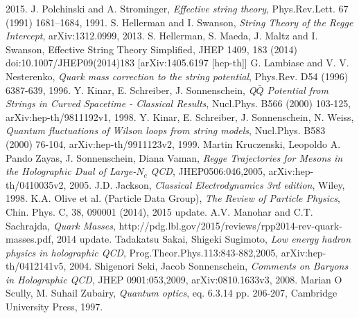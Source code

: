 \documentclass[11pt,a4paper]{article}
\begin{document}
\begin{thebibliography}{9}
	2015.
	J. Polchinski and A. Strominger,
	\emph{Effective string theory},
	Phys.Rev.Lett. 67 (1991) 1681–1684,
	1991.
	S. Hellerman and I. Swanson,
	\emph{String Theory of the Regge Intercept},
	arXiv:1312.0999,
	2013.
	S. Hellerman, S. Maeda, J. Maltz and I. Swanson, 
	Effective String Theory Simplified,
	JHEP 1409, 183 (2014) doi:10.1007/JHEP09(2014)183 [arXiv:1405.6197 [hep-th]]
	G. Lambiase and V. V. Nesterenko,
	\emph{Quark mass correction to the string potential},
	Phys.Rev. D54 (1996) 6387-639,
	1996.
	Y. Kinar, E. Schreiber, J. Sonnenschein,
	\emph{Q$\bar{Q}$ Potential from Strings in Curved Spacetime - Classical Results},
	Nucl.Phys. B566 (2000) 103-125,
	arXiv:hep-th/9811192v1,
	1998.
	Y. Kinar, E. Schreiber, J. Sonnenschein, N. Weiss,
	\emph{Quantum fluctuations of Wilson loops from string models},
	Nucl.Phys. B583 (2000) 76-104,
	arXiv:hep-th/9911123v2,
	1999.
	Martin Kruczenski, Leopoldo A. Pando Zayas, J. Sonnenschein, Diana Vaman,
	\emph{Regge Trajectories for Mesons in the Holographic Dual of Large-$N_c$ QCD},
	JHEP0506:046,2005,
	arXiv:hep-th/0410035v2,
	2005.
	J.D. Jackson,
	\emph{Classical Electrodynamics 3rd edition},
	Wiley,
	1998.	
	K.A. Olive et al. (Particle Data Group),
	\emph{The Review of Particle Physics},
	Chin. Phys. C, 38, 090001 (2014),
	2015 update.
	A.V. Manohar and C.T. Sachrajda,
	\emph{Quark Masses},
	http://pdg.lbl.gov/2015/reviews/rpp2014-rev-quark-masses.pdf,
	2014 update.	
	Tadakatsu Sakai, Shigeki Sugimoto,
	\emph{Low energy hadron physics in holographic QCD},
	Prog.Theor.Phys.113:843-882,2005,
	arXiv:hep-th/0412141v5,
	2004.
	Shigenori Seki, Jacob Sonnenschein,
	\emph{Comments on Baryons in Holographic QCD},
	JHEP 0901:053,2009,
	arXiv:0810.1633v3,
	2008.
	Marian O Scully, M. Suhail Zubairy,
	\emph{Quantum optics},  eq. 6.3.14 pp. 206-207,
	Cambridge University Press,
	1997.
	
\end{thebibliography}
\end{document}
